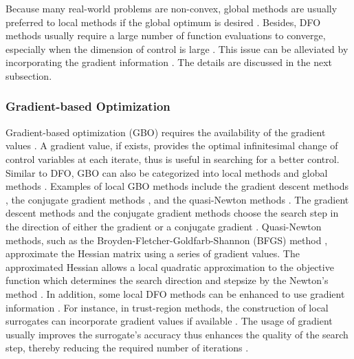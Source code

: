 Because many real-world problems are non-convex, global methods are usually preferred to local methods
if the global optimum is desired \cite{gradfreereview}. Besides, DFO methods usually require
a large number of function evaluations to converge, especially when the dimension of control is large
\cite{gradfreereview}. This issue can be alleviated by incorporating the gradient information
\cite{derivative RKHS, grad coKriging, grad particle swarm, grad cuckoo}.
The details are discussed in the next subsection.\\

\subsubsection{Gradient-based Optimization}
\label{section: GBO}
Gradient-based optimization (GBO) requires the availability of the gradient values \cite{opt via sim review, nonlinear program}. 
A gradient value, if exists,
provides the optimal infinitesimal change of control variables at each iterate,
thus is useful in searching for a better control.
Similar to DFO, GBO can also be categorized into local methods and global methods \cite{opt via sim review}.
Examples of local GBO methods include the gradient descent methods 
\cite{stochastic search, backtrack line search}, the conjugate gradient 
methods \cite{linear conjugate gradient, nonlinear conjugate gradient}, and the quasi-Newton methods \cite{quasiNewton, LBFGS}. 
The gradient descent methods and
the conjugate gradient methods
choose the search step in the direction of either the gradient \cite{stochastic search, backtrack line search} or a conjugate gradient
\cite{linear conjugate gradient, nonlinear conjugate gradient}.
Quasi-Newton methods, such as the Broyden-Fletcher-Goldfarb-Shannon (BFGS) method
\cite{quasiNewton},
approximate the Hessian matrix using a series of gradient values. The approximated Hessian allows
a local quadratic approximation to the objective function which determines the search direction
and stepsize
by the Newton's method \cite{quasiNewton}. 
In addition, some local DFO methods can be enhanced to use gradient information \cite{trust region global, trust region inexact grad}. 
For instance,
in trust-region methods, the construction of local surrogates can incorporate 
gradient values if available \cite{trust region global, trust region inexact grad}.
The usage of gradient usually improves the surrogate's accuracy thus enhances the quality
of the search step, thereby reducing the required number of iterations
\cite{trust region global, trust region inexact grad}.\\

